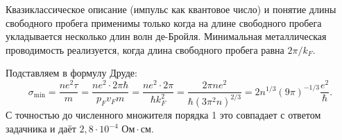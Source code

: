 \documentclass[a4paper]{article}
\begin{document}
\begin{hiProb}[3.88]
\end{hiProb}
\begin{sol}
	Квазиклассическое описание (импульс
	как квантовое число) и понятие длины
	свободного пробега применимы только 
	когда на длине свободного пробега
	укладывается несколько длин волн
	де-Бройля. Минимальная металлическая
	проводимость реализуется, когда
	длина свободного пробега равна $2\pi /k_F$.

	Подставляем в формулу Друде:
	\[
	\sigma_{\min}= \frac{ne^2 \tau}{m}=
	\frac{ne^2 \cdot 2\pi \hbar }{p_F v_F m}=
	\frac{ne^2 \cdot 2\pi}{\hbar  k_F^2}=
	\frac{2\pi ne^2}{\hbar \left( 3\pi
	^2 n\right) ^{2 /3}}=
	2n^{1 /3}(9\pi) ^{-1 /3}\frac{e^2}{\hbar }
	.\] 
	С точностью до численного множителя порядка
	1 это совпадает с ответом задачника
	и даёт $2,8\cdot 10^{-4}\text{ Ом}\cdot\text{см}$.
\end{sol}
\end{document}
